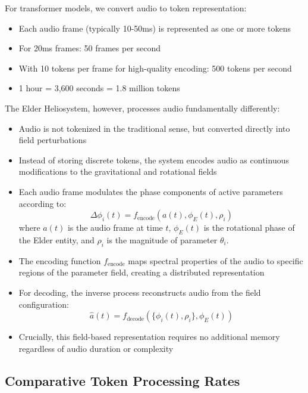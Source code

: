 For transformer models, we convert audio to token representation:
\begin{itemize}
    \item Each audio frame (typically 10-50ms) is represented as one or more tokens
    \item For 20ms frames: 50 frames per second
    \item With 10 tokens per frame for high-quality encoding: 500 tokens per second
    \item 1 hour = 3,600 seconds = 1.8 million tokens
\end{itemize}

The Elder Heliosystem, however, processes audio fundamentally differently:
\begin{itemize}
    \item Audio is not tokenized in the traditional sense, but converted directly into field perturbations
    \item Instead of storing discrete tokens, the system encodes audio as continuous modifications to the gravitational and rotational fields
    \item Each audio frame modulates the phase components of active parameters according to:
    \begin{equation}
    \Delta\phi_i(t) = f_{\text{encode}}(a(t), \phi_E(t), \rho_i)
    \end{equation}
    where $a(t)$ is the audio frame at time $t$, $\phi_E(t)$ is the rotational phase of the Elder entity, and $\rho_i$ is the magnitude of parameter $\theta_i$.
    
    \item The encoding function $f_{\text{encode}}$ maps spectral properties of the audio to specific regions of the parameter field, creating a distributed representation
    
    \item For decoding, the inverse process reconstructs audio from the field configuration:
    \begin{equation}
    \hat{a}(t) = f_{\text{decode}}(\{\phi_i(t), \rho_i\}, \phi_E(t))
    \end{equation}
    
    \item Crucially, this field-based representation requires no additional memory regardless of audio duration or complexity
\end{itemize}

\subsection{Comparative Token Processing Rates}

